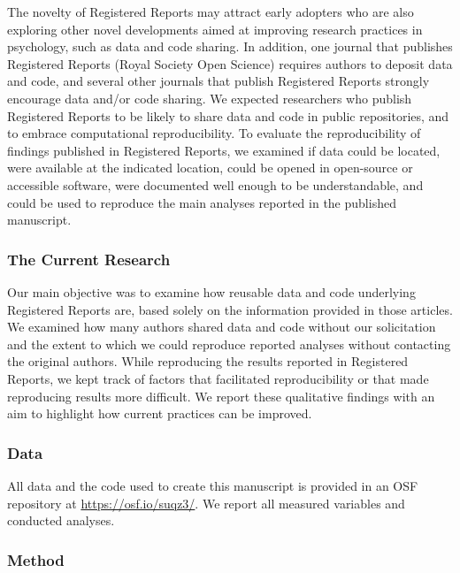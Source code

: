 \documentclass[
  ,jou, a4paper,floatsintext]{apa6}
\begin{document}
The novelty of Registered Reports may attract early adopters who are also exploring other novel developments aimed at improving research practices in psychology, such as data and code sharing. In addition, one journal that publishes Registered Reports (Royal Society Open Science) requires authors to deposit data and code, and several other journals that publish Registered Reports strongly encourage data and/or code sharing. We expected researchers who publish Registered Reports to be likely to share data and code in public repositories, and to embrace computational reproducibility. To evaluate the reproducibility of findings published in Registered Reports, we examined if data could be located, were available at the indicated location, could be opened in open-source or accessible software, were documented well enough to be understandable, and could be used to reproduce the main analyses reported in the published manuscript.

\hypertarget{the-current-research}{%
\subsubsection{The Current Research}\label{the-current-research}}

Our main objective was to examine how reusable data and code underlying Registered Reports are, based solely on the information provided in those articles. We examined how many authors shared data and code without our solicitation and the extent to which we could reproduce reported analyses without contacting the original authors. While reproducing the results reported in Registered Reports, we kept track of factors that facilitated reproducibility or that made reproducing results more difficult. We report these qualitative findings with an aim to highlight how current practices can be improved.

\hypertarget{data}{%
\subsubsection{Data}\label{data}}

All data and the code used to create this manuscript is provided in an OSF repository at \url{https://osf.io/suqz3/}. We report all measured variables and conducted analyses.

\hypertarget{method}{%
\subsubsection{Method}\label{method}}
\end{document}
